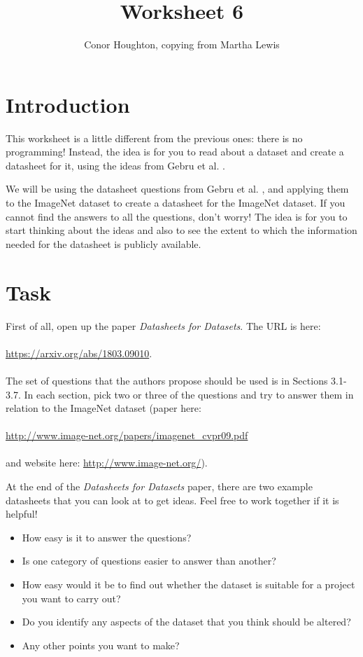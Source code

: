 \documentclass[a4paper,12pt]{article}
\title{Worksheet 6}
\author{Conor Houghton, copying from Martha Lewis}
\date{}
\begin{document}
\maketitle

\section{Introduction}

This worksheet is a little different from the previous ones: there is
no programming! Instead, the idea is for you to read about a dataset
and create a datasheet for it, using the ideas from Gebru et
al. \cite{gebru2021datasheets}.

We will be using the datasheet questions from Gebru et
al. \cite{gebru2021datasheets}, and applying them to the ImageNet
dataset \cite{deng2009imagenet} to create a datasheet for the ImageNet
dataset. If you cannot find the answers to all the questions, don’t
worry! The idea is for you to start thinking about the ideas and also
to see the extent to which the information needed for the datasheet is
publicly available.

\section{Task}

First of all, open up the paper \textit{Datasheets for Datasets}. The
URL is here:\\
\\
\url{https://arxiv.org/abs/1803.09010}.\\
\\
The set of questions that the authors propose should be used is in
Sections 3.1-3.7. In each section, pick two or three of the questions
and try to answer them in relation to the ImageNet dataset (paper
here:\\ \\ \url{http://www.image-net.org/papers/imagenet_cvpr09.pdf}\\ \\ and
website here: \url{http://www.image-net.org/}).

At the end of the \textit{Datasheets for Datasets} paper, there are two example datasheets that you can look at to get ideas. Feel free to work together if it is helpful!

\begin{itemize}
    \item How easy is it to answer the questions?
    \item Is one category of questions easier to answer than another?
    \item How easy would it be to find out whether the dataset is suitable for a project you want to carry out?
    \item Do you identify any aspects of the dataset that you think should be altered?
    \item Any other points you want to make?
\end{itemize}
\end{document}

